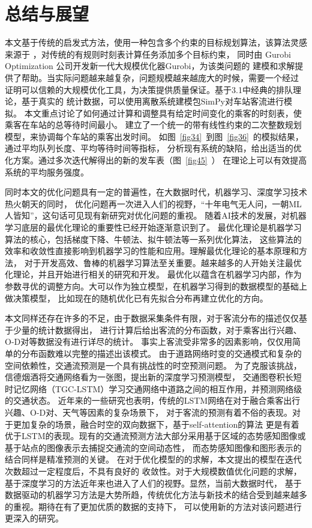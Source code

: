 \section{总结与展望}
本文基于传统的启发式方法，使用一种包含多个约束的目标规划算法，该算法灵感来源于
\cite{CHIERICI200499,2002}，对传统的有规则时刻表计算任务添加多个目标约束，
同时由 Gurobi Optimization 公司开发新一代大规模优化器Gurobi，为该类问题的
建模和求解提供了帮助。当实际问题越来越复杂，问题规模越来越庞大的时候，需要一个经过
证明可以信赖的大规模优化工具，为决策提供质量保证。基于3.1中经典的排队理论，基于真实的
统计数据，可以使用离散系统建模包SimPy对车站客流进行模拟。
本文重点讨论了如何通过计算和调整具有给定时间变化的乘客的时刻表，使乘客在车站的总等待时间最小。
建立了一个统一的带有线性约束的二次整数规划模型，来协调每个车站的乘客出发时间。
如图~\ref{fig34}~到图~\ref{fig36}~的模拟结果，通过平均队列长度、平均等待时间等指标，
分析现有系统的缺陷，给出适当的优化方案。通过多次迭代解得出的新的发车表（图~\ref{fig45}~）
在理论上可以有效提高系统的平均服务强度。

同时本文的优化问题具有一定的普遍性，在大数据时代，机器学习、深度学习技术热火朝天的同时，
优化问题再一次进入人们的视野，“十年电气无人问，一朝ML人皆知”，这句话可见现有新研究对优化问题的重视。
随着AI技术的发展，对机器学习底层的最优化理论的重要性已经开始逐渐意识到了。
最优化理论是机器学习算法的核心，包括梯度下降、牛顿法、拟牛顿法等一系列优化算法，
这些算法的效率和收敛性直接影响到机器学习的性能和应用。理解最优化理论的基本原理和方法，
对于开发高效、鲁棒的机器学习算法至关重要。越来越多的人开始关注最优化理论，并且开始进行相关的研究和开发。
最优化以蕴含在机器学习内部，作为参数寻优的调整方向。大可以作为独立模型，在机器学习得到的数据模型的基础上做决策模型，
比如现在的随机优化已有先拟合分布再建立优化的方向。

本文同样还存在许多的不足，由于数据采集条件有限，对于客流分布的描述仅仅基于少量的统计数据得出，
进行计算后给出客流的分布函数，对于乘客出行兴趣、O-D对等数据没有进行详尽的统计。
事实上客流受非常多的因素影响，仅仅用简单的分布函数难以完整的描述出该模式。
由于道路网络时变的交通模式和复杂的空间依赖性，交通流预测是一个具有挑战性的时空预测问题。
为了克服该挑战，信德烟酒将交通网络看为一张图，提出新的深度学习预测模型，
交通图卷积长短时记忆网络（TGC-LSTM）学习交通网络中道路之间的相互作用，并预测网络级的交通状态。
近年来的一些研究\cite{bjtu2020}也表明，传统的LSTM网络在对于融合乘客出行兴趣、O-D对、天气等因素的复杂场景下，
对于客流的预测有着不俗的表现。对于更加复杂的场景，融合时空的双向数据下，基于self-attention的算法\cite{transformer2022}
更是有着优于LSTM的表现。现有的交通流预测方法大部分采用基于区域的态势感知图像或基于站点的图像表示去捕捉交通流的空间动态性，
而态势感知图像和图形表示的结合同样是精准预测的关键。
在对于优化模型的的求解，本文提出的模型在迭代次数超过一定程度后，不具有良好的
收敛性。对于大规模数值优化问题的求解，基于深度学习的方法\cite{nair2021solving}近年来也进入了人们的视野。显然，当前大数据时代，
基于数据驱动的机器学习方法是大势所趋，传统优化方法与新技术的结合受到越来越多的重视。期待在有了更加优质的数据的支持下，
可以使用新的方法对该问题进行更深入的研究。



